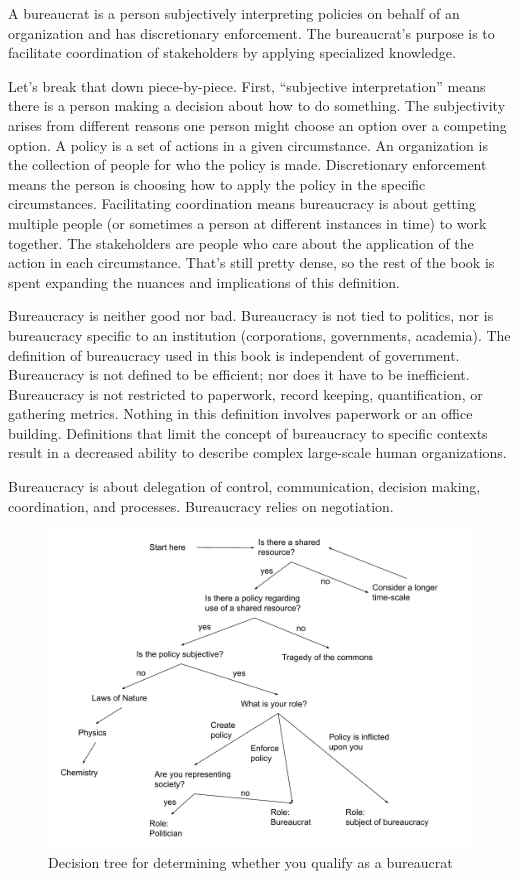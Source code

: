 A \gls{bureaucrat} is a person subjectively interpreting policies on behalf of an organization and has discretionary enforcement. The bureaucrat's purpose is to facilitate coordination of stakeholders by applying specialized knowledge. 

Let's break that down piece-by-piece. First, ``subjective interpretation'' means there is a person making a decision about how to do something. The subjectivity arises from different reasons one person might choose an option over a competing option.  A \gls{policy} is a set of actions in a given circumstance. An \gls{organization} is the collection of people for who the policy is made. Discretionary enforcement means the person is choosing how to apply the policy in the specific circumstances. Facilitating coordination means bureaucracy is about getting multiple people (or sometimes a person at different instances in time) to work together. The stakeholders are people who care about the application of the action in each circumstance.  That's still pretty dense, so the rest of the book is spent expanding the nuances and implications of this definition.

Bureaucracy is neither good nor bad. Bureaucracy is not tied to politics, nor is bureaucracy specific to an institution (corporations, governments, academia). The definition of bureaucracy used in this book is independent of government. Bureaucracy is not defined to be efficient; nor does it have to be inefficient. Bureaucracy is not restricted to paperwork, record keeping, quantification, or gathering metrics. Nothing in this definition involves paperwork or an office building. Definitions that limit the concept of bureaucracy to specific contexts result in a decreased ability to describe complex large-scale human organizations. 

Bureaucracy is about delegation of control, communication, decision making, coordination, and processes. Bureaucracy relies on negotiation. 

\begin{figure}
    \centering
    \includegraphics[width=1.05\textwidth]{images/am_I_a_bureaucrat.pdf}
    \caption{Decision tree for determining whether you qualify as a bureaucrat}
    \label{fig:am-I-a-bureaucrat}
\end{figure}

